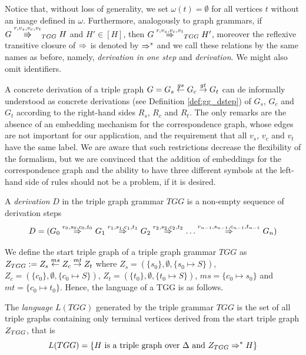 Notice that, without loss of generality, we set $\omega(t) = \emptyset$ for all vertices $t$ without an image defined in $\omega$. Furthermore, analogously to graph grammars, if $G \cderiv{r}{v_s,v_c,v_t}{TGG} H$ and $H' \in [H]$, then $G \tderiv{r}{v_s,v_c,v_t}{TGG} H'$, moreover the reflexive transitive closure of $\tderiv{}{}{}$ is denoted by $\Rightarrow^*_{}$ and we call these relations by the same names as before, namely, \emph{derivation in one step} and \emph{derivation}. We might also omit identifiers.

A concrete derivation of a triple graph $G = G_s \overset{gs}{\leftarrow} G_c \overset{gt}{\rightarrow} G_t$ can de informally understood as concrete derivations (see Definition \ref{def:gg_dstep}) of $G_s$, $G_c$ and $G_t$ according to the right-hand sides $R_s$, $R_c$ and $R_t$. The only remarks are the absence of an embedding mechanism for the correspondence graph, whose edges are not important for our application, and the requirement that all $v_s$, $v_c$ and $v_t$ have the same label. We are aware that such restrictions decrease the flexibility of the formalism, but we are convinced that the addition of embeddings for the correspondence graph and the ability to have three different symbols at the left-hand side of rules should not be a problem, if it is desired.

\begin{definition}
	A \emph{derivation} $D$ in the triple graph grammar $TGG$ is a non-empty sequence of derivation steps
	\begin{equation*}
		D = (G_0 \tderiv{r_0}{s_0,c_0,t_0}{} G_1 \tderiv{r_1}{s_1,c_1,t_1}{} G_2 \tderiv{r_2}{s_2,c_2,t_2}{} \dots \tderiv{r_{n-1}}{s_{n-1},c_{n-1},t_{n-1}}{} G_n)
	\end{equation*}
\end{definition}

We define the start triple graph of a triple graph grammar $TGG$ as $Z_{TGG} := Z_s \overset{ms}{\leftarrow} Z_c \overset{mt}{\rightarrow} Z_t$ where $Z_s = (\{s_0\},\emptyset,\{s_0 \mapsto S\})$, $Z_c = (\{c_0\},\emptyset,\{c_0 \mapsto S\})$, $Z_t = (\{t_0\},\emptyset,\{t_0 \mapsto S\})$, $ms = \{c_0 \mapsto s_0 \}$ and $mt = \{c_0 \mapsto t_0 \}$. Hence, the language of a TGG is as follows.

\begin{definition}
	\label{def:tlanguage}
	The \emph{language} $L(TGG)$ generated by the triple grammar $TGG$ is the set of all triple graphs containing only terminal vertices derived from the start triple graph $Z_{TGG}$, that is
	\begin{equation*}
		L(TGG) = \{H \text{ is a triple graph over } \Delta \text{ and } Z_{TGG} \Rightarrow^*_{} H\}
	\end{equation*}
\end{definition}


